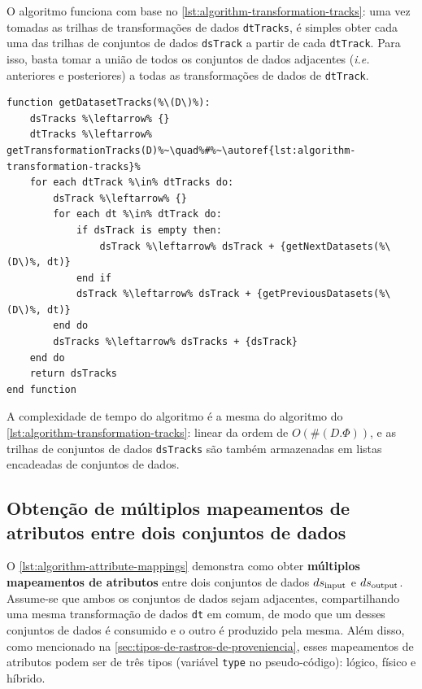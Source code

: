 O algoritmo funciona com base no \autoref{lst:algorithm-transformation-tracks}: uma vez tomadas as trilhas de transformações de dados \texttt{dtTracks}, é simples obter cada uma das trilhas de conjuntos de dados \texttt{dsTrack} a partir de cada \texttt{dtTrack}. Para isso, basta tomar a união de todos os conjuntos de dados adjacentes (\textit{i.e.} anteriores e posteriores) a todas as transformações de dados de \texttt{dtTrack}.

\begin{minipage}[c]{0.95\textwidth}
\begin{lstlisting}[language=pseudocode,label={lst:algorithm-dataset-tracks},caption={[Detecção das trilhas de conjuntos de dados]Detecção do rastro do fluxo de dados no nível de trilhas de conjuntos de dados.}]
function getDatasetTracks(%\(D\)%):
    dsTracks %\leftarrow% {}
    dtTracks %\leftarrow% getTransformationTracks(D)%~\quad%#%~\autoref{lst:algorithm-transformation-tracks}%
    for each dtTrack %\in% dtTracks do:
        dsTrack %\leftarrow% {}
        for each dt %\in% dtTrack do:
            if dsTrack is empty then:
                dsTrack %\leftarrow% dsTrack + {getNextDatasets(%\(D\)%, dt)}
            end if
            dsTrack %\leftarrow% dsTrack + {getPreviousDatasets(%\(D\)%, dt)}
        end do
        dsTracks %\leftarrow% dsTracks + {dsTrack}
    end do
    return dsTracks
end function
\end{lstlisting}
\end{minipage}

A complexidade de tempo do algoritmo é a mesma do algoritmo do \autoref{lst:algorithm-transformation-tracks}: linear da ordem de \( O(\#(D.\Phi)) \), e as trilhas de conjuntos de dados \texttt{dsTracks} são também armazenadas em listas encadeadas de conjuntos de dados.

\subsection{Obtenção de múltiplos mapeamentos de atributos entre dois conjuntos de dados}

O \autoref{lst:algorithm-attribute-mappings} demonstra como obter \textbf{múltiplos mapeamentos de atributos} entre dois conjuntos de dados \(ds_{\textup{input}}\) e \(ds_{\textup{output}}\). Assume-se que ambos os conjuntos de dados sejam adjacentes, compartilhando uma mesma transformação de dados \texttt{dt} em comum, de modo que um desses conjuntos de dados é consumido e o outro é produzido pela mesma. Além disso, como mencionado na \autoref{sec:tipos-de-rastros-de-proveniencia}, esses mapeamentos de atributos podem ser de três tipos (variável \texttt{type} no pseudo-código): lógico, físico e híbrido.

